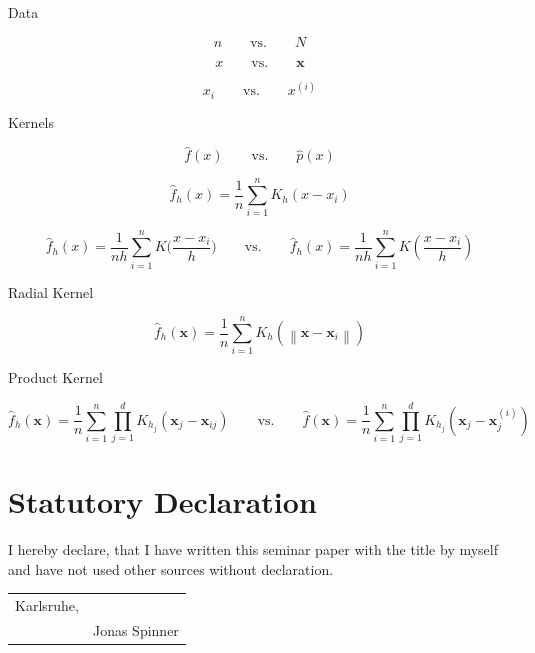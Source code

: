 \documentclass{article}
\newcommand{\norm}[1]{\left\lVert#1\right\rVert}
\begin{document}
Data

\[
n\qquad \text{vs.} \qquad N
\]

\[
x\qquad \text{vs.} \qquad \bm{x}
\]

\[
x_i\qquad \text{vs.} \qquad x^{(i)}
\]

Kernels

\[
\hat{f}(x)\qquad \text{vs.} \qquad \hat{p}(x)
\]

\[
\hat{f}_h(x) = \frac{1}{n} \sum_{i=1}^n K_h(x - x_i)
\]

\[
\hat{f}_h(x) = \frac{1}{nh} \sum_{i=1}^n K\biggl(\frac{x - x_i}{h}\biggr)\qquad \text{vs.} \qquad \hat{f}_h(x) = \frac{1}{nh} \sum_{i=1}^n K\left(\frac{x - x_i}{h}\right)
\]

Radial Kernel

\[
\hat{f}_h(\bm{x}) = \frac{1}{n} \sum_{i=1}^{n} K_h(\norm{\bm{x} -\bm{x}_i})
\]

Product Kernel

\[
\hat{f}_h(\bm{x}) = \frac{1}{n} \sum_{i=1}^{n} \prod_{j=1}^d K_{h_j}(\bm{x}_j -\bm{x}_{ij})\qquad \text{vs.} \qquad \hat{f}(\bm{x}) = \frac{1}{n} \sum_{i=1}^{n} \prod_{j=1}^d K_{h_j}(\bm{x}_j -\bm{x}_j^{(i)})
\]

\newpage
\section*{Statutory Declaration}

I hereby declare, that I have written this seminar paper with the title \textbf{\thetitle} by myself and have not used other sources without declaration.


\begin{tabular}{@{}p{2in}p{2.5in}@{}}
	Karlsruhe, \thedate & \hrulefill \\
	& Jonas Spinner
\end{tabular}
\end{document}
